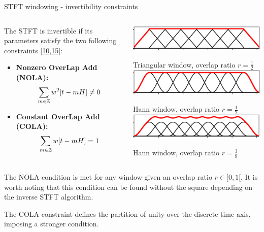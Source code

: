 \documentclass[10pt,american,ignorenonframetext,aspectratio=1610]{beamer}
\providecommand{\tightlist}{%
  \setlength{\itemsep}{0pt}\setlength{\parskip}{0pt}}
\theoremstyle{remark}
\begin{document}
\begin{frame}{STFT windowing - invertibility constraints}
\protect\hypertarget{stft-windowing---invertibility-constraints}{}

\begin{columns}[T]
\begin{column}{0.6\textwidth}
The STFT is invertible if its parameters satisfy the two following
constraints
{[}\protect\hyperlink{ref-griffin1983}{10},\protect\hyperlink{ref-muller2015}{15}{]}:

\begin{itemize}
\tightlist
\item
  \textbf{Nonzero OverLap Add (NOLA):}
  \[\sum\limits_{m\in\mathbb{Z}} w^2[t-mH] \neq 0\]
\item
  \textbf{Constant OverLap Add (COLA):}
  \[\sum\limits_{m\in\mathbb{Z}} w[t-mH] = 1\]
\end{itemize}
\end{column}

\begin{column}{0.4\textwidth}
\includegraphics[width=\textwidth]{img/woa_triangular_1_2.png}

\par

Triangular window, overlap ratio \(r=\frac{1}{2}\)
\includegraphics[width=\textwidth]{img/woa_hann_1_2.png}

\par

Hann window, overlap ratio \(r=\frac{1}{2}\)
\includegraphics[width=\textwidth]{img/woa_hann_3_8.png}

\par

Hann window, overlap ratio \(r=\frac{3}{8}\)
\end{column}
\end{columns}

The NOLA condition is met for any window given an overlap ratio
\(r\in[0,1[\). It is worth noting that this condition can be found
without the square depending on the inverse STFT algorithm.

The COLA constraint defines the partition of unity over the discrete
time axis, imposing a stronger condition.

\end{frame}
\end{document}
